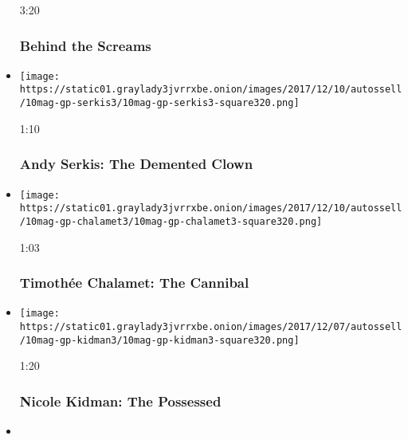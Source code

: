 \begin{itemize}
  3:20

  \hypertarget{behind-the-screams}{%
  \subsubsection{Behind the Screams}\label{behind-the-screams}}
\item
  \href{https://www.nytimes3xbfgragh.onion/video/magazine/100000005588849/andy-serkis-the-demented-clown.html?action=click\&module=video-series-bar\&region=header\&pgtype=Article\&playlistId=video/magazine}{}

  \texttt{[image: https://static01.graylady3jvrrxbe.onion/images/2017/12/10/autossell/10mag-gp-serkis3/10mag-gp-serkis3-square320.png]}

  1:10

  \hypertarget{andy-serkis-the-demented-clown}{%
  \subsubsection{Andy Serkis: The Demented
  Clown}\label{andy-serkis-the-demented-clown}}
\item
  \href{https://www.nytimes3xbfgragh.onion/video/magazine/100000005588864/timothee-chalamet-the-cannibal.html?action=click\&module=video-series-bar\&region=header\&pgtype=Article\&playlistId=video/magazine}{}

  \texttt{[image: https://static01.graylady3jvrrxbe.onion/images/2017/12/10/autossell/10mag-gp-chalamet3/10mag-gp-chalamet3-square320.png]}

  1:03

  \hypertarget{timotheux301e-chalamet-the-cannibal}{%
  \subsubsection{Timothée Chalamet: The
  Cannibal}\label{timotheux301e-chalamet-the-cannibal}}
\item
  \href{https://www.nytimes3xbfgragh.onion/video/magazine/100000005588835/nicole-kidman-the-possessed.html?action=click\&module=video-series-bar\&region=header\&pgtype=Article\&playlistId=video/magazine}{}

  \texttt{[image: https://static01.graylady3jvrrxbe.onion/images/2017/12/07/autossell/10mag-gp-kidman3/10mag-gp-kidman3-square320.png]}

  1:20

  \hypertarget{nicole-kidman-the-possessed}{%
  \subsubsection{Nicole Kidman: The
  Possessed}\label{nicole-kidman-the-possessed}}
\item
  \href{https://www.nytimes3xbfgragh.onion/video/magazine/100000005588895/cynthia-nixon-the-ghost-bride.html?action=click\&module=video-series-bar\&region=header\&pgtype=Article\&playlistId=video/magazine}{}


\end{itemize}
